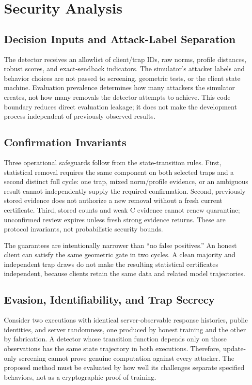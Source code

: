 \documentclass[conference]{IEEEtran}
\begin{document}
\section{Security Analysis}
\subsection{Decision Inputs and Attack-Label Separation}
The detector receives an allowlist of client/trap IDs, raw norms, profile
distances, robust scores, and exact-sendback indicators. The simulator's attacker
labels and behavior choices are not passed to screening, geometric tests, or
the client state machine. Evaluation prevalence determines how many attackers
the simulator creates, not how many removals the detector attempts to achieve.
This code boundary reduces direct evaluation leakage; it does not make the
development process independent of previously observed results.

\subsection{Confirmation Invariants}
Three operational safeguards follow from the state-transition rules.
First, statistical removal requires the same component on both selected traps
and a second distinct full cycle: one trap, mixed norm/profile evidence, or
an ambiguous result cannot independently supply the required confirmation.
Second, previously stored evidence does not authorize a new removal without
a fresh current certificate. Third, stored counts and weak C evidence cannot
renew quarantine; unconfirmed review expires unless fresh strong evidence
returns. These are protocol invariants, not probabilistic security bounds.

The guarantees are intentionally narrower than ``no false positives.'' An
honest client can satisfy the same geometric gate in two cycles. A clean
majority and independent trap draws do not make the resulting statistical
certificates independent, because clients retain the same data and related
model trajectories.

\subsection{Evasion, Identifiability, and Trap Secrecy}
Consider two executions with identical server-observable response histories,
public identities, and server randomness, one produced by honest training and
the other by fabrication. A detector whose transition function depends only on
those observations has the same state trajectory in both executions. Therefore,
update-only screening cannot prove genuine computation against every attacker.
The proposed method must be evaluated by how well its challenges separate
specified behaviors, not as a cryptographic proof of training.
\end{document}
